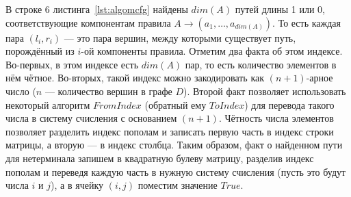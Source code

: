 \begin{algorithm}[H]
    \footnotesize
%
%
%
%
%
%
%
\end{algorithm}

В строке 6 листинга~\ref{lst:algomcfg} найдены $dim(A)$ путей длины 1 или 0, соответствующие компонентам правила $A \rightarrow (a_1, \dots, a_{dim(A)})$. То есть каждая пара $(l_i, r_i)$ --- это пара вершин, между которыми существует путь, порождённый из $i$-ой компоненты правила. Отметим два факта об этом индексе. Во-первых, в этом индексе есть $dim(A)$ пар, то есть количество элементов в нём чётное. Во-вторых, такой индекс можно закодировать как $(n+1)$-арное число ($n$ --- количество вершин в графе $D$). Второй факт позволяет использовать некоторый алгоритм $FromIndex$ (обратный ему $ToIndex$) для перевода такого числа в систему счисления с основанием $(n+1)$. Чётность числа элементов позволяет разделить индекс пополам и записать первую часть в индекс строки матрицы, а вторую --- в индекс столбца. Таким образом, факт о найденном пути для нетерминала запишем в квадратную булеву матрицу, разделив индекс пополам и переведя каждую часть в нужную систему счисления (пусть это будут числа $i$ и $j$), а в ячейку $(i, j)$ поместим значение $True$.


